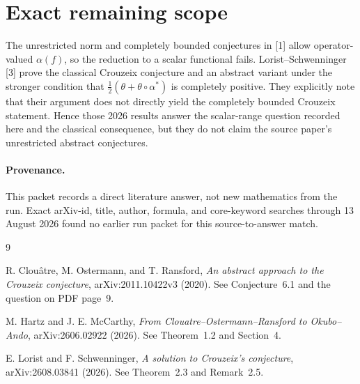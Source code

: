 \documentclass[11pt]{article}
\begin{document}
\section*{Exact remaining scope}
The unrestricted norm and completely bounded conjectures in [1] allow
operator-valued \(\alpha(f)\), so the reduction to a scalar functional fails.
Lorist--Schwenninger [3] prove the classical Crouzeix conjecture and an
abstract variant under the stronger condition that
\(\tfrac12(\theta+\theta\!\circ\!\alpha{}^*)\) is completely positive.
They explicitly note that their argument does not directly yield the
completely bounded Crouzeix statement.  Hence those 2026 results answer the
scalar-range question recorded here and the classical consequence, but they
do not claim the source paper's unrestricted abstract conjectures.

\paragraph{Provenance.}
This packet records a direct literature answer, not new mathematics from the
run.  Exact arXiv-id, title, author, formula, and core-keyword searches through
13 August 2026 found no earlier run packet for this source-to-answer match.

\begin{thebibliography}{9}
\raggedright
{}
R. Clou\^atre, M. Ostermann, and T. Ransford,
\emph{An abstract approach to the Crouzeix conjecture},
arXiv:2011.10422v3 (2020).  See Conjecture~6.1 and the question on PDF page~9.

M. Hartz and J. E. McCarthy,
\emph{From Clouatre--Ostermann--Ransford to Okubo--Ando},
arXiv:2606.02922 (2026).  See Theorem~1.2 and Section~4.

E. Lorist and F. Schwenninger,
\emph{A solution to Crouzeix's conjecture},
arXiv:2608.03841 (2026).  See Theorem~2.3 and Remark~2.5.
\end{thebibliography}
\end{document}

